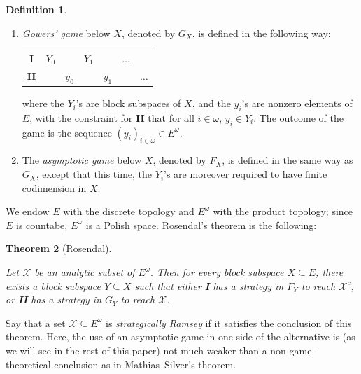 \documentclass[a4paper,11pt]{article}
\makeatletter
\newtheorem{thm}{Theorem}[section]
\theoremstyle{definition}
\newtheorem{defin}[thm]{Definition}
\numberwithin{equation}{section}
\newcommand{\X}{\mathcal{X}}
\newcommand{\I}{\textbf{I}}
\newcommand{\II}{\textbf{II}}
\newcommand{\alaligne}{~\vspace*{\topsep}\nobreak\@afterheading}
\makeatother
\begin{document}
\begin{defin}

\alaligne

\begin{enumerate}

\item \emph{Gowers' game} below $X$, denoted by $G_X$, is defined in the following way:

\smallskip

\begin{tabular}{ccccccc}
\textbf{I} & $Y_0$ & & $Y_1$ & & $\hdots$ & \\
\textbf{II} & & $y_0$ & & $y_1$ & & $\hdots$ 
\end{tabular}

\smallskip

\noindent where the $Y_i$'s are block subspaces of $X$, and the $y_i$'s are nonzero elements of $E$, with the constraint for \II{} that for all $i \in \omega$, $y_i \in Y_i$. The outcome of the game is the sequence $(y_i)_{i \in \omega} \in E^\omega$.

\item The \emph{asymptotic game} below $X$, denoted by $F_X$, is defined in the same way as $G_X$, except that this time, the $Y_i$'s are moreover required to have finite codimension in $X$.

\end{enumerate}

\end{defin}

We endow $E$ with the discrete topology and $E^\omega$ with the product topology; since $E$ is countabe, $E^\omega$ is a Polish space. Rosendal's theorem is the following:

\begin{thm}[Rosendal]\label{RosendalGowersthm}

Let $\X$ be an analytic subset of $E^\omega$. Then for every block subspace $X \subseteq E$, there exists a block subspace $Y \subseteq X$ such that either \I{} has a strategy in $F_Y$ to reach $\X^c$, or \II{} has a strategy in $G_Y$ to reach $\X$.

\end{thm}

Say that a set $\X \subseteq E^\omega$ is \emph{strategically Ramsey} if it satisfies the conclusion of this theorem. Here, the use of an asymptotic game in one side of the alternative is (as we will see in the rest of this paper) not much weaker than a non-game-theoretical conclusion as in Mathias--Silver's theorem.
\end{document}
